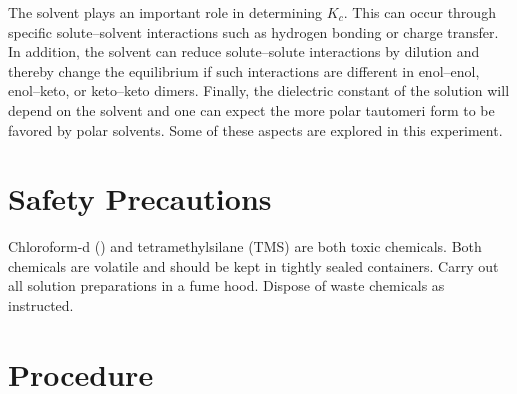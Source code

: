\documentclass[nobib,nofonts,nols,nohyper,draft]{tufte-handout}
\begin{document}
The solvent plays an important role in determining \( K_c \). 
This can occur through specific solute--solvent interactions such as hydrogen bonding or charge transfer. 
In addition, the solvent can reduce solute--solute interactions by dilution and thereby change the equilibrium if such interactions are different in enol--enol, enol--keto, or keto--keto dimers. 
Finally, the dielectric constant of the solution will depend on the solvent and one can expect the more polar tautomeri form to be favored by polar solvents. 
Some of these aspects are explored in this experiment. 



\pagebreak

\section{Safety Precautions} %
\label{sec:safety}

Chloroform-d () and tetramethylsilane (TMS) are both toxic chemicals. 
Both chemicals are volatile and should be kept in tightly sealed containers. 
Carry out all solution preparations in a fume hood. 
Dispose of waste chemicals as instructed. 


\section{Procedure} %
\label{sec:procedure}
\end{document}
